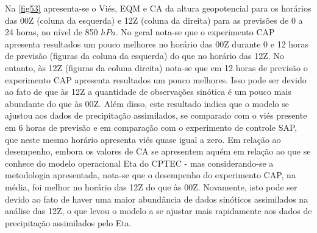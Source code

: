 Na \autoref{fig53} apresenta-se o Viés, EQM e CA da altura geopotencial para os horários das 00Z (coluna da esquerda) e 12Z (coluna da direita) para as previsões de 0 a 24 horas, no nível de 850 $hPa$. No geral nota-se que o experimento CAP apresenta resultados um pouco melhores no horário das 00Z durante 0 e 12 horas de previsão (figuras da coluna da esquerda) do que no horário das 12Z. No entanto, às 12Z (figuras da coluna direita) nota-se que em 12 horas de previsão o experimento CAP apresenta resultados um pouco melhores. Isso pode ser devido ao fato de que às 12Z a quantidade de observações sinótica é um pouco mais abundante do que às 00Z. Além disso, este resultado indica que o modelo se ajustou aos dados de precipitação assimilados, se comparado com o viés presente em 6 horas de previsão e em comparação com o experimento de controle SAP, que neste mesmo horário apresenta viés quase igual a zero. Em relação ao desempenho, embora os valores de CA se apresentem aquém em relação ao que se conhece do modelo operacional Eta do CPTEC - mas considerando-se a metodologia apresentada, nota-se que o desempenho do experimento CAP, na média, foi melhor no horário das 12Z do que às 00Z. Novamente, isto pode ser devido ao fato de haver uma maior abundância de dados sinóticos assimilados na análise das 12Z, o que levou o modelo a se ajustar mais rapidamente aos dados de precipitação assimilados pelo Eta.

\break

